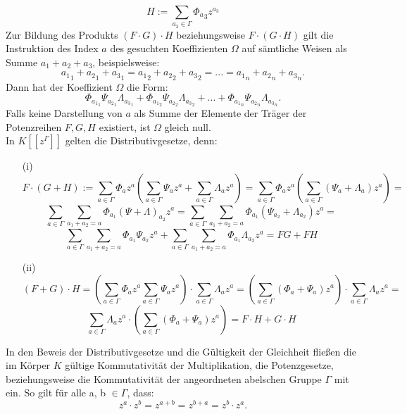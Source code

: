 {\[H := \sum_{a_3 \in \Gamma}^{} {\Phi_a}_3 z^{a_3} \]
Zur Bildung des Produkts $(F\cdot G)\cdot H$ beziehungsweise $F\cdot(G\cdot H)$ gilt die Instruktion des Index $a$ des gesuchten Koeffizienten $\Omega$ auf sämtliche Weisen als Summe $a_1 + a_2 + a_3$, beispielsweise: 
\[{a_1}_1 + {a_2}_1 + {a_3}_1 = {a_1}_2 + {a_2}_2 + {a_3}_2 = ... =  {a_1}_n + {a_2}_n + {a_3}_n.\]
Dann hat der Koeffizient $\Omega$ die Form: 
\[\Phi_{{a_1}_1} \Psi_{{a_2}_1} \Lambda_{{a_3}_1} + \Phi_{{a_1}_2} \Psi_{{a_2}_2} \Lambda_{{a_3}_2} + ... + \Phi_{{a_1}_n} \Psi_{{a_2}_n} \Lambda_{{a_3}_n}.\]
Falls keine Darstellung von $a$ als Summe der Elemente der Träger der Potenzreihen $F, G, H$ existiert, ist $\Omega$ gleich null.\\
In $K[[z^\Gamma]]$ gelten die Distributivgesetze, denn:
\begin{enumerate}
\item[(i)]\[F\cdot(G + H) := \sum_{a \in \Gamma}^{} {\Phi_a} z^{a} \left( \sum_{a \in \Gamma}^{} {\Psi_a} z^{a} +  \sum_{a \in \Gamma}^{} {\Lambda_a} z^{a} \right) = \sum_{a \in \Gamma}^{} {\Phi_a} z^{a} \left(\sum_{a \in \Gamma}^{} \left({\Psi_a}+ \Lambda_a\right) z^{a}\right) = \]
\[\sum_{a \in \Gamma}^{}\sum_{a_1 + a_2 = a}^{}\Phi_{a_1} {\left(\Psi + \Lambda\right)}_{a_2}z^a = \sum_{a \in \Gamma}^{}\sum_{a_1 + a_2 = a}^{}\Phi_{a_1} \left(\Psi_{a_2} + \Lambda_{a_2}\right) z^a=\]
\[\sum_{a \in \Gamma}^{}\sum_{a_1 + a_2 = a}^{}\Phi_{a_1} \Psi_{a_2}z^a + \sum_{a \in \Gamma}^{}\sum_{a_1 + a_2 = a}^{}\Phi_{a_1} \Lambda_{a_2}z^a = FG + FH\]
\item[(ii)] \[(F + G) \cdot H = \left(\sum_{a \in \Gamma}^{} {\Phi_a} z^{a}  \sum_{a \in \Gamma}^{} {\Psi_a} z^{a}\right) \cdot \sum_{a \in \Gamma}^{} {\Lambda_a} z^{a} = \left(\sum_{a \in \Gamma}^{} \left({\Phi_a}+ \Psi_a\right) z^{a}\right)\cdot \sum_{a \in \Gamma}^{} {\Lambda_a} z^{a} =\]
\[ \sum_{a \in \Gamma}^{} {\Lambda_a} z^{a} \cdot \left(\sum_{a \in \Gamma}^{} \left({\Phi_a}+ \Psi_a\right) z^{a}\right) =   F\cdot H + G\cdot H\]
\end{enumerate}  
In den Beweis der Distributivgesetze und die Gültigkeit der Gleichheit fließen die im Körper $K$ gültige Kommutativität der Multiplikation, die Potenzgesetze, beziehungsweise die Kommutativität der angeordneten abelschen Gruppe $\Gamma$ mit ein. So gilt für alle a, b $\in \Gamma$, dass: 
\[z^a \cdot z^b = z^{a+b} = z^{b+a} = z^b \cdot z^a.\] 
}
%
